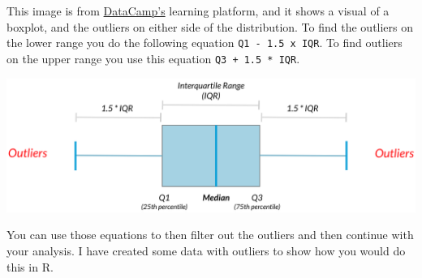 \documentclass[
  letterpaper,
  DIV=11,
  numbers=noendperiod]{scrreprt}
\begin{document}
This image is from
\href{https://campus.datacamp.com/courses/introduction-to-statistics-in-r/summary-statistics?ex=10}{DataCamp's}
learning platform, and it shows a visual of a boxplot, and the outliers
on either side of the distribution. To find the outliers on the lower
range you do the following equation \texttt{Q1\ -\ 1.5\ x\ IQR}. To find
outliers on the upper range you use this equation
\texttt{Q3\ +\ 1.5\ *\ IQR}.

\includegraphics{./data-camp-outliers.png}

You can use those equations to then filter out the outliers and then
continue with your analysis. I have created some data with outliers to
show how you would do this in R.
\end{document}
